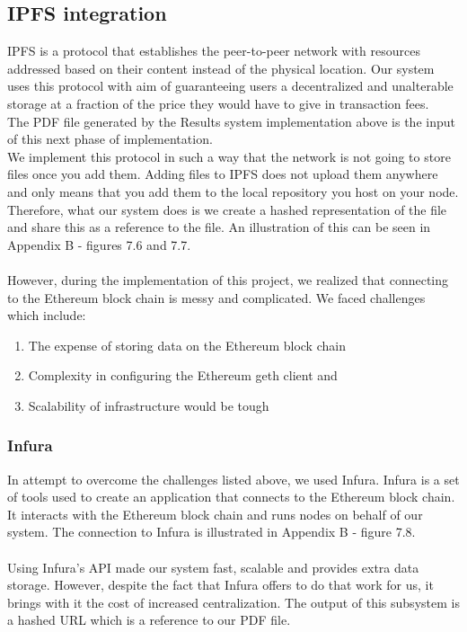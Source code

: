 \subsection{IPFS integration}
IPFS is a protocol that establishes the peer-to-peer network with resources addressed based on their content instead of the physical location. Our system uses this protocol with aim of guaranteeing users a decentralized and unalterable storage at a fraction of the price they  would have to give in transaction fees.\\
The PDF file generated by the Results system implementation above is the input of this next phase of implementation.\\
We implement this protocol in such a way that the network is not going to store files once you add them. Adding files to IPFS does not upload them anywhere and only means that you add them to the local repository you host on your node. Therefore, what our system does is we create a hashed representation of the file and share this as a reference to the file. An illustration of this can be seen in Appendix B - figures 7.6 and 7.7.\\\\
However, during the implementation of this project, we realized that connecting to the Ethereum block chain is messy and complicated. We faced challenges which include:
\begin{enumerate}
\item The expense of storing data on the Ethereum block chain
\item Complexity in configuring the Ethereum geth client and
\item Scalability of infrastructure would be tough
\end{enumerate}
\subsubsection{Infura}
In attempt to overcome the challenges listed above, we used Infura. Infura is a set of tools used to create an application that connects to the Ethereum block chain. It interacts with the Ethereum block chain and runs nodes on behalf of our system. The connection to Infura is illustrated in Appendix B - figure 7.8.\\\\
Using Infura's API made our system fast, scalable and provides extra data storage. However, despite the fact that Infura offers to do that work for us, it brings with it the cost of increased centralization.
The output of this subsystem is a hashed  URL which is a reference to our PDF file.\\\\
